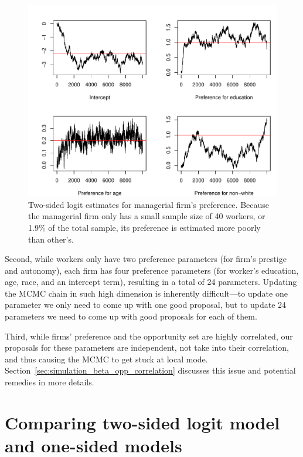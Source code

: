 \begin{figure}[!ht]
  \centering
  \includegraphics[width=\textwidth,keepaspectratio]{../figure/sim_labor_nojobs_beta_emp3}
  \caption[Simulation, poor mixing due to small sample size.]{Two-sided logit
    estimates for managerial firm's preference. Because the managerial firm only
  has a small sample size of 40 workers, or 1.9\% of the total sample, its
  preference is estimated more poorly than other's.}
  \label{fig:sim_labor_nojobs_beta_emp3}
\end{figure}

Second, while workers only have two preference parameters (for firm's prestige and autonomy), each firm has four
preference parameters (for worker's education, age, race, and an intercept
term), resulting in a total of 24 parameters. Updating the MCMC chain in such
high dimension is inherently difficult---to update one parameter we only need to
come up with one good proposal, but to update 24 parameters we need to come up
with good proposals for each of them.

Third, while firms' preference and the opportunity set are highly correlated,
our proposals for these parameters are independent, not take into their
correlation, and thus causing the MCMC to get stuck at local mode.
Section~\ref{sec:simulation_beta_opp_correlation} discusses this issue and
potential remedies in more details.

\section{Comparing two-sided logit model and one-sided models}

